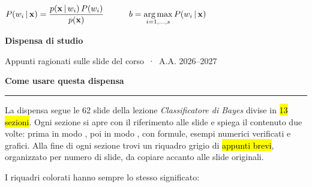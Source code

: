 \vspace*{15.2cm}
\begin{center}
\begin{tcolorbox}[enhanced,width=.88\linewidth,colback=white,colframe=navy!35,arc=6pt,boxrule=.8pt,halign=flush center,top=10pt,bottom=10pt]
\large$\displaystyle P(w_i\,|\,\mathbf{x}) = \frac{p(\mathbf{x}\,|\,w_i)\,P(w_i)}{p(\mathbf{x})}\qquad\quad b=\operatorname*{arg\,max}_{i=1,\dots,s} P(w_i\,|\,\mathbf{x})$
\end{tcolorbox}
\vspace{1.0cm}

{\headfont\large\color{navy}\bfseries Dispensa di studio\par}
\vspace{2pt}
{\headfont\color{grigio}Appunti ragionati sulle slide del corso \,·\, A.A. 2026–2027\par}
\vspace{1.2cm}

\end{center}

\clearpage
\thispagestyle{plain}
{\headfont\bfseries\Huge\color{navy}Come usare questa dispensa\par}
\vspace{4pt}
{\color{teal}\rule{3cm}{2.5pt}}
\vspace{8pt}

La dispensa segue le 62 slide della lezione \emph{Classificatore di Bayes} divise in \hl{13 sezioni}. Ogni sezione si apre con il riferimento alle slide e spiega il contenuto due volte: prima in modo , poi in modo , con formule, esempi numerici verificati e grafici. Alla fine di ogni sezione trovi un riquadro grigio di \hl{appunti brevi}, organizzato per numero di slide, da copiare accanto alle slide originali.

I riquadri colorati hanno sempre lo stesso significato:

